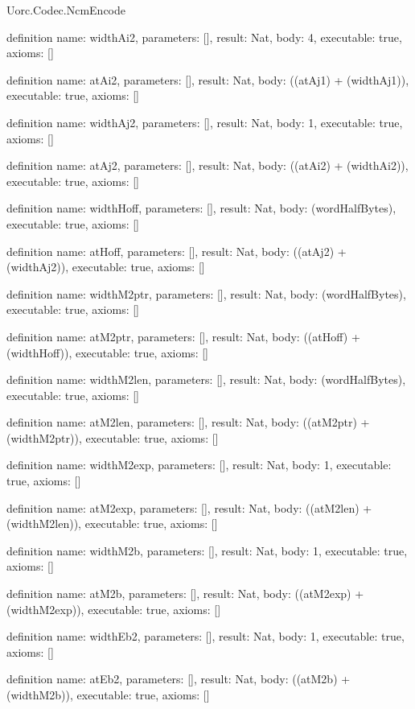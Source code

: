 \begin{lexlean}{Uorc.Codec.NcmEncode}
\begin{semanticmodule}
definition{
  name: widthAi2,
  parameters: [],
  result: Nat,
  body: 4,
  executable: true,
  axioms: []
}

definition{
  name: atAi2,
  parameters: [],
  result: Nat,
  body: ((atAj1) + (widthAj1)),
  executable: true,
  axioms: []
}

definition{
  name: widthAj2,
  parameters: [],
  result: Nat,
  body: 1,
  executable: true,
  axioms: []
}

definition{
  name: atAj2,
  parameters: [],
  result: Nat,
  body: ((atAi2) + (widthAi2)),
  executable: true,
  axioms: []
}

definition{
  name: widthHoff,
  parameters: [],
  result: Nat,
  body: (wordHalfBytes),
  executable: true,
  axioms: []
}

definition{
  name: atHoff,
  parameters: [],
  result: Nat,
  body: ((atAj2) + (widthAj2)),
  executable: true,
  axioms: []
}

definition{
  name: widthM2ptr,
  parameters: [],
  result: Nat,
  body: (wordHalfBytes),
  executable: true,
  axioms: []
}

definition{
  name: atM2ptr,
  parameters: [],
  result: Nat,
  body: ((atHoff) + (widthHoff)),
  executable: true,
  axioms: []
}

definition{
  name: widthM2len,
  parameters: [],
  result: Nat,
  body: (wordHalfBytes),
  executable: true,
  axioms: []
}

definition{
  name: atM2len,
  parameters: [],
  result: Nat,
  body: ((atM2ptr) + (widthM2ptr)),
  executable: true,
  axioms: []
}

definition{
  name: widthM2exp,
  parameters: [],
  result: Nat,
  body: 1,
  executable: true,
  axioms: []
}

definition{
  name: atM2exp,
  parameters: [],
  result: Nat,
  body: ((atM2len) + (widthM2len)),
  executable: true,
  axioms: []
}

definition{
  name: widthM2b,
  parameters: [],
  result: Nat,
  body: 1,
  executable: true,
  axioms: []
}

definition{
  name: atM2b,
  parameters: [],
  result: Nat,
  body: ((atM2exp) + (widthM2exp)),
  executable: true,
  axioms: []
}

definition{
  name: widthEb2,
  parameters: [],
  result: Nat,
  body: 1,
  executable: true,
  axioms: []
}

definition{
  name: atEb2,
  parameters: [],
  result: Nat,
  body: ((atM2b) + (widthM2b)),
  executable: true,
  axioms: []
}


\end{semanticmodule}
\end{lexlean}
